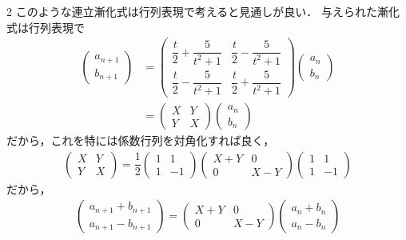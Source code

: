 \documentclass[../../main.tex]{subfiles}
\begin{document}
\begin{multicols}{2}
  このような連立漸化式は行列表現で考えると見通しが良い．
  与えられた漸化式は行列表現で
  \begin{align}
    \begin{pmatrix} a_{n+1} \\ b_{n+1}
    \end{pmatrix}
    & =
    \begin{pmatrix} \dfrac{t}{2} + \dfrac{5}{t^2+1} & \dfrac{t}{2} - \dfrac{5}{t^2+1} \\ \dfrac{t}{2} - \dfrac{5}{t^2+1} & \dfrac{t}{2} + \dfrac{5}{t^2+1}
    \end{pmatrix}
    \begin{pmatrix} a_n \\ b_n
    \end{pmatrix} \\
    & =
    \begin{pmatrix} X & Y \\ Y  & X
    \end{pmatrix}
    \begin{pmatrix} a_n \\ b_n
    \end{pmatrix}
  \end{align}
  だから，これを特には係数行列を対角化すれば良く，
  \begin{align}
    \begin{pmatrix} X & Y \\ Y  & X
    \end{pmatrix} = \dfrac{1}{2}
    \begin{pmatrix} 1 & 1 \\ 1  & -1
    \end{pmatrix}
    \begin{pmatrix} X+Y & 0 \\ 0  & X-Y
    \end{pmatrix}
    \begin{pmatrix} 1 & 1 \\ 1  & -1
    \end{pmatrix}
  \end{align}
  だから，
  \begin{align}
    \begin{pmatrix} a_{n+1}+b_{n+1} \\ a_{n+1}-b_{n+1}
    \end{pmatrix} =
    \begin{pmatrix} X+Y & 0 \\ 0  & X-Y
    \end{pmatrix}
    \begin{pmatrix} a_{n}+b_{n} \\ a_{n}-b_{n}

\end{pmatrix}
\end{align}
\end{multicols}
\end{document}
